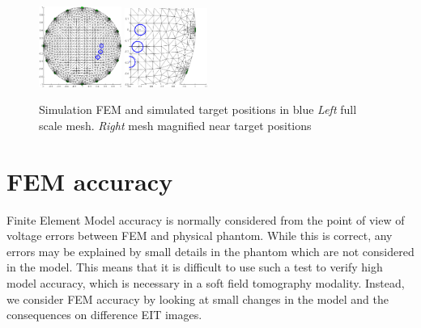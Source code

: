 \documentclass[letterpaper,twocolumn,10pt]{article}
\begin{document}
%
\begin{figure}[tbh]
\begin{center}
 \includegraphics[width= 0.24\textwidth]{figs/fig1a.png}
 \includegraphics[width= 0.24\textwidth]{figs/fig1b.png}
\caption{ \label{fig:fem1}
\small
Simulation FEM and simulated target positions in blue
{\em Left} full scale mesh.
{\em Right} mesh magnified near target positions 
}
\end{center}
\vspace{-1.0cm}
\end{figure}

\section{FEM accuracy}

Finite Element Model accuracy is normally considered
from the point of view of voltage errors between FEM and
physical phantom. While this is correct, any errors may be explained
by small details in the phantom which are not considered
in the model. This means that it is difficult to use such
a test to verify high model accuracy, which is necessary
in a soft field tomography modality.
Instead, we consider FEM accuracy by
looking at small changes in the model and the
consequences on difference EIT images.
\end{document}

